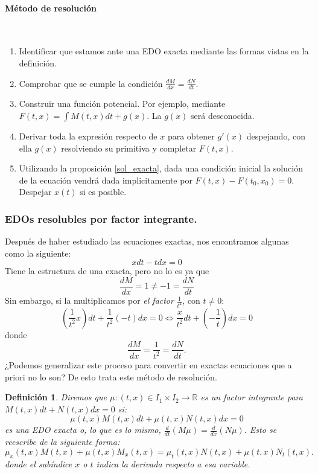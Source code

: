 \documentclass{article}
\newcommand{\iindex}[1]{\emph{#1}\index{#1}}
\theoremstyle{theorem-style}  %
\theoremstyle{definition-style}
\newtheorem{definition}{Definición}[section]
\theoremstyle{example-style}
\begin{document}
\paragraph{Método de resolución} \ 
\begin{enumerate}
	\item Identificar que estamos ante una EDO exacta mediante las formas vistas en la definición.
	\item Comprobar que se cumple la condición $\frac{dM}{dx} = \frac{dN}{dt}$.
	\item Construir una función potencial. Por ejemplo, mediante $ F(t,x)=\int M(t, x)dt + g(x) $. La $ g(x) $ será desconocida.
	\item Derivar toda la expresión respecto de $ x $ para obtener $ g'(x) $ despejando, con ella $ g(x) $ resolviendo su primitiva y completar $ F(t,x) $.
	\item Utilizando la proposición \ref{sol_exacta}, dada una condición inicial la solución de la ecuación vendrá dada implicitamente por $F(t, x) - F(t_0, x_0) = 0$. Despejar $ x(t) $ si es posible. 
\end{enumerate}
\subsubsection{EDOs resolubles por factor integrante.}
Después de haber estudiado las ecuaciones exactas, nos encontramos algunas como la siguiente:
\[ xdt - tdx = 0 \] 
Tiene la estructura de una exacta, pero no lo es ya que 
\[ \frac{dM}{dx}=1\neq-1=\frac{dN}{dt} \]
Sin embargo, si la multiplicamos por \textit{el factor} $\frac{1}{t^2}$, con $t \neq 0$:
\[(\frac{1}{t^2}x)dt + \frac{1}{t^2}(-t)dx = 0 \Leftrightarrow \frac{x}{t^2}dt + (-\frac{1}{t})dx = 0\]
donde
\[\frac{dM}{dx} = \frac{1}{t^2} = \frac{dN}{dt}.\]
¿Podemos generalizar este proceso para convertir en exactas ecuaciones que a priori no lo son? De esto trata este método de resolución.
\begin{definition}
	Diremos que $\mu : (t, x) \in I_1 \times I_2 \longrightarrow \mathbb{R}$ es un \iindex{factor integrante} para $M(t, x)dt + N(t, x)dx = 0$ si:
	\[\mu(t, x)M(t, x)dt + \mu(t, x)N(t, x)dx = 0\]
	es una EDO exacta o, lo que es lo mismo, $\frac{d}{dt}(M\mu) = \frac{d}{dx}(N\mu)$. Esto se reescribe de la siguiente forma:
	\begin{equation} \label{eqInte}
	\mu_x(t, x)M(t, x) + \mu(t, x)M_x(t, x) = \mu_t(t, x)N(t, x) + \mu(t, x)N_t(t, x).
	\end{equation}
	donde el subíndice $ x $ o $ t $ indica la derivada respecto a esa variable.
\end{definition}
\end{document}

